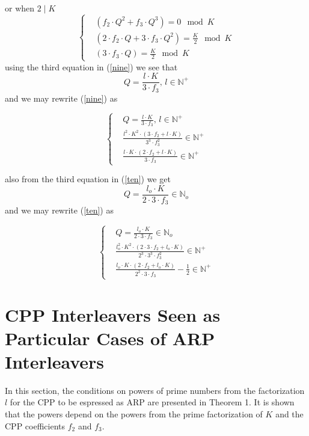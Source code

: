 \documentclass[fontsize=12pt]{article}
\newcommand{\cd}{\cdot}
\begin{document}
  or when $2 \mid K$
  \begin{equation}
    \begin{cases}
      &(f_2\cdot Q^2 +f_3 \cdot Q^3) = 0 \mod K \\
      &(2\cdot f_2 \cdot Q +3\cdot f_3 \cdot Q^2) = \frac{K}{2} \mod K\\
      &(3\cdot f_3 \cdot Q)= \frac{K}{2} \mod K
    \end{cases}
    \label{ten}
  \end{equation}
   using the third equation in (\ref{nine}) we see that $$Q = \frac{l\cdot K}{3\cdot f_3}, \, l \in \mathbb{N}^+$$ 
   and we may rewrite (\ref{nine}) as 
   
   \begin{equation}
    \begin{cases}
      &Q = \frac{l\cdot K}{3\cdot f_3}, \, l \in \mathbb{N}^+\\
      &\frac{l^2\cdot K^2\cdot (3\cdot f_2 + l\cd K)}{3^3 \cd f_3^2} \in \mathbb{N}^+\\
      &\frac{l\cd K \cd (2 \cd f_2 + l \cd K)}{3\cd f_3} \in \mathbb{N}^+
    \end{cases}
    \label{eleven}
  \end{equation}
  
  also from the third equation in (\ref{ten}) we get
  $$ Q = \frac{l_o \cd K}{2 \cd 3 \cd f_3} \in \mathbb{N}_o $$
  and we may rewrite (\ref{ten}) as 
  
   \begin{equation}
    \begin{cases}
      &Q = \frac{l_o \cd K}{2 \cd 3 \cd f_3} \in \mathbb{N}_o\\
      &\frac{l_o^2\cdot K^2\cdot (2 \cd 3\cdot f_2 + l_o\cd K)}{2^3 \cd 3^3 \cd f_3^2} \in \mathbb{N}^+\\
      &\frac{l_o\cd K \cd (2 \cd f_2 + l_o \cd K)}{2^2 \cd 3\cd f_3}-\frac{1}{2} \in \mathbb{N}^+
    \end{cases}
    \label{twelve}
  \end{equation}
  
  \section{CPP Interleavers Seen as Particular Cases
of ARP Interleavers }
In this section, the conditions on powers of prime numbers from the factorization $l$ for the CPP to be espressed as ARP are presented in Theorem 1. It is shown that the powers depend on the powers from the prime factorization of $K$ and the CPP coefficients $f_2$ and $f_3$. 
\end{document}
